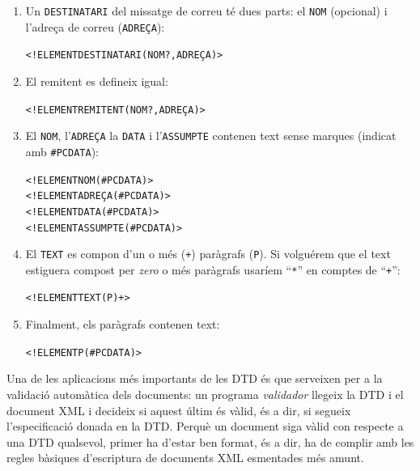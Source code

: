 \begin{enumerate}
\item Un \texttt{DESTINATARI} del missatge de correu té dues parts: el
  \texttt{NOM} (opcional) i l'adreça de correu (\texttt{ADREÇA}):
\begin{small}\begin{alltt}
<!ELEMENT DESTINATARI (NOM?, ADREÇA)>
\end{alltt}\end{small}
\item El remitent es defineix igual:
\begin{small}\begin{alltt}
<!ELEMENT REMITENT (NOM?, ADREÇA)>
\end{alltt}\end{small}
\item El \texttt{NOM}, l'\texttt{ADREÇA} la \texttt{DATA} i
l'\texttt{ASSUMPTE} contenen text sense marques (indicat amb
  \texttt{\#PCDATA}):
\begin{small}\begin{alltt}
<!ELEMENT NOM (#PCDATA)>
<!ELEMENT ADREÇA (#PCDATA)>
<!ELEMENT DATA (#PCDATA)>
<!ELEMENT ASSUMPTE (#PCDATA)>
\end{alltt}\end{small}

\item El \texttt{TEXT} es compon d'un o més (\texttt{+}) paràgrafs
  (\texttt{P}). Si volguérem que el text estiguera compost per
  \emph{zero} o més paràgrafs usaríem ``\texttt{*}'' en comptes de
  ``\texttt{+}'':
\begin{small}\begin{alltt}
<!ELEMENT TEXT (P)+>
\end{alltt}\end{small}

\item Finalment, els paràgrafs contenen text:
\begin{small}\begin{alltt}
<!ELEMENT P (#PCDATA)>
\end{alltt}\end{small}
\end{enumerate}

Una de les aplicacions més importants de les DTD és que serveixen per
a la validació automàtica dels documents: un programa \emph{validador}
llegeix la DTD i el document XML i decideix si aquest últim és vàlid,
és a dir, si segueix l'especificació donada en la DTD. Perquè un
document siga vàlid con respecte a una DTD qualsevol, primer ha
d'estar ben format, és a dir, ha de complir amb les regles bàsiques
d'escriptura de documents XML esmentades més amunt.

